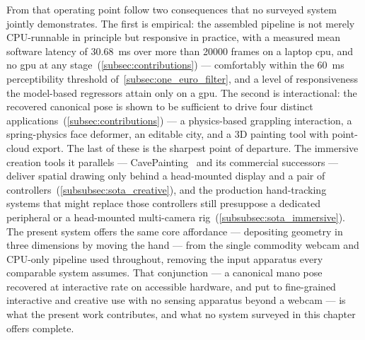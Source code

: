 From that operating point follow two consequences that no surveyed system jointly
demonstrates.
The first is empirical: the assembled pipeline is not merely CPU-runnable in
principle but responsive in practice, with a measured mean software latency of
\SI{30.68}{\ms} over more than \num{20000} frames on a laptop \acrshort{cpu}, and
no \acrshort{gpu} at any stage~(\autoref{subsec:contributions}) --- comfortably
within the \SI{60}{\ms} perceptibility threshold
of~\autoref{subsec:one_euro_filter}, and a level of responsiveness the
model-based regressors attain only on a \acrshort{gpu}.
The second is interactional: the recovered canonical pose is shown to be
sufficient to drive four distinct
applications~(\autoref{subsec:contributions}) --- a physics-based grappling
interaction, a spring-physics face deformer, an editable city, and a 3D painting
tool with point-cloud export.
The last of these is the sharpest point of departure.
The immersive creation tools it parallels ---
CavePainting~\cite{keefe2001cavepainting} and its commercial successors ---
deliver spatial drawing only behind a head-mounted display and a pair of
controllers~(\autoref{subsubsec:sota_creative}), and the production
hand-tracking systems that might replace those controllers still presuppose a
dedicated peripheral or a head-mounted multi-camera
rig~(\autoref{subsubsec:sota_immersive}).
The present system offers the same core affordance --- depositing geometry in
three dimensions by moving the hand --- from the single commodity webcam and
CPU-only pipeline used throughout, removing the input apparatus every comparable
system assumes.
That conjunction --- a canonical \acrshort{mano} pose recovered at interactive
rate on accessible hardware, and put to fine-grained interactive and creative use
with no sensing apparatus beyond a webcam --- is what the present work
contributes, and what no system surveyed in this chapter offers complete.
